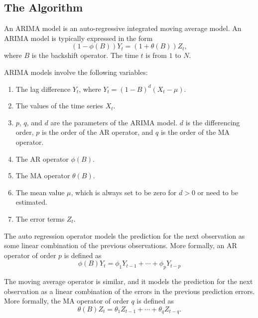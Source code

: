 \documentclass[english,12pt]{article}
\begin{document}
\subsection{The Algorithm}


An ARIMA model is an auto-regressive integrated moving average model. An ARIMA
model is typically expressed in the form
\begin{equation}
(1 - \phi(B)) Y_t  = (1 + \theta(B)) Z_t,
\end{equation}
where $B$ is the backshift operator. The time $t$ is from $1$ to $N$.

ARIMA models involve the following variables:
\begin{enumerate}
   \item The lag difference $Y_{t}$, where  $Y_{t} = {(1-B)}^{d}(X_{t} - \mu)$.
    \item The values of the time series $X_t$.
    \item $p$, $q$, and $d$ are the parameters of the ARIMA model.
      $d$ is the differencing order, $p$ is the order of the AR
      operator, and $q$ is the order of the MA operator.
    \item The AR operator $\phi(B)$.
    \item The MA operator $\theta(B)$.
    \item The mean value $\mu$, which is always set to be zero for
      $d>0$ or need to be estimated.
    \item The error terms $Z_t$.
\end{enumerate}

The  auto regression operator models the prediction for the next
observation  as some linear combination of the previous observations.
More formally, an AR operator of order $p$ is defined as
\begin{equation}
\phi(B) Y_t= \phi_1 Y_{t-1}   + \cdots +  \phi_{p} Y_{t-p}
\end{equation}

The moving average operator is similar, and it models the prediction
for the next observation as a linear combination of the errors in the
previous prediction errors.  More formally, the MA operator of order
$q$ is defined as
\begin{equation}
\theta(B) Z_t =   \theta_{1} Z_{t-1} + \cdots + \theta_{q} Z_{t-q}.
\end{equation}
\end{document}
